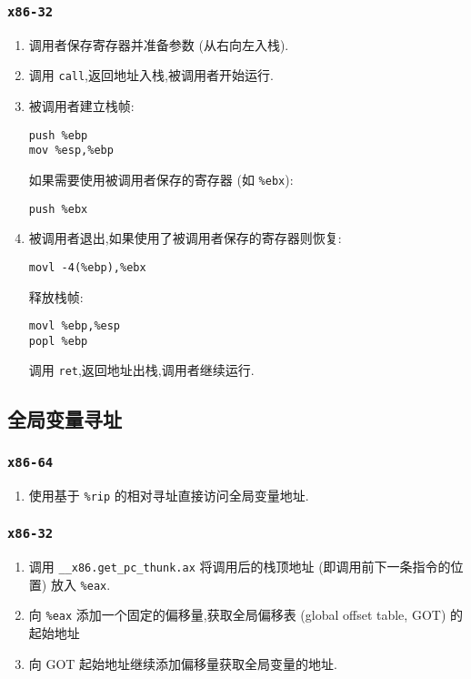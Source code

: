             \subsubsection{\texttt{x86-32}}
                \begin{enumerate}
                    \item 调用者保存寄存器并准备参数 (从右向左入栈).
                    \item 调用 \texttt{call},返回地址入栈,被调用者开始运行.
                    \item 被调用者建立栈帧:

                        \texttt{push \%ebp\\mov \%esp,\%ebp}

                        如果需要使用被调用者保存的寄存器 (如 \texttt{\%ebx}):

                        \texttt{push \%ebx}
                    \item 被调用者退出,如果使用了被调用者保存的寄存器则恢复:

                        \texttt{movl -4(\%ebp),\%ebx}

                        释放栈帧:

                        \texttt{movl \%ebp,\%esp\\popl \%ebp}

                        调用 \texttt{ret},返回地址出栈,调用者继续运行.
                \end{enumerate}
        \subsection{全局变量寻址}
            \subsubsection{\texttt{x86-64}}
                \begin{enumerate}
                    \item 使用基于 \texttt{\%rip} 的相对寻址直接访问全局变量地址.
                \end{enumerate}
            \subsubsection{\texttt{x86-32}}
                \begin{enumerate}
                    \item 调用 \texttt{\_\_x86.get\_pc\_thunk.ax} 将调用后的栈顶地址 (即调用前下一条指令的位置) 放入 \texttt{\%eax}.
                    \item 向 \texttt{\%eax} 添加一个固定的偏移量,获取全局偏移表 (global offset table, GOT) 的起始地址
                    \item 向 GOT 起始地址继续添加偏移量获取全局变量的地址.
                \end{enumerate}
